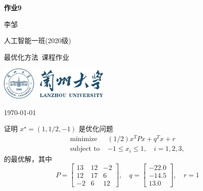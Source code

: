 \documentclass[10pt, a4paper]{article}
\newcommand\course{最优化方法}                         %
\begin{document}
\begin{titlepage}
    \begin{center}
        \vspace*{3.5cm}
            
        \Huge
        \textbf{作业9}
            
        \vspace{2cm}
        \LARGE
        李邹
            
        \vspace{0.1cm}
        \Large
        人工智能一班(2020级)                      %
        
            
        \vfill
        
        \course \ 课程作业
            
        \vspace{1cm}
            
        \includegraphics[width=0.4\textwidth]{lzu-logo.png}
        \\
        
        \Large
        
        \today
            
    \end{center}
\end{titlepage}


\newpage
\begin{Problem}
    证明 $x^{\star}=(1,1 / 2,-1)$ 是优化问题
    $$
    \begin{array}{ll}
    \operatorname{minimize} & (1 / 2) x^{T} P x+q^{T} x+r \\
    \text {subject to } & -1 \leq x_{i} \leq 1, \quad i=1,2,3,
    \end{array}
    $$
    的最优解，其中
    $$
    P=\left[\begin{array}{rrr}
    13 & 12 & -2 \\
    12 & 17 & 6 \\
    -2 & 6 & 12
    \end{array}\right], \quad q=\left[\begin{array}{r}
    -22.0 \\
    -14.5 \\
    13.0
    \end{array}\right], \quad r=1
    $$
\end{Problem}
    
\end{document}
